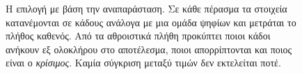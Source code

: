 \begin{figure}[H]
    \caption[Επιλογή με βάση την αναπαράσταση]{Η επιλογή με βάση την αναπαράσταση. Σε κάθε πέρασμα τα στοιχεία
    κατανέμονται σε κάδους ανάλογα με μια ομάδα ψηφίων και μετράται το πλήθος
    καθενός. Από τα αθροιστικά πλήθη προκύπτει ποιοι κάδοι ανήκουν εξ ολοκλήρου στο
    αποτέλεσμα, ποιοι απορρίπτονται και ποιος είναι ο \emph{κρίσιμος}. Καμία
    σύγκριση μεταξύ τιμών δεν εκτελείται ποτέ.}
    \label{fig:bg-radix}
\end{figure}
